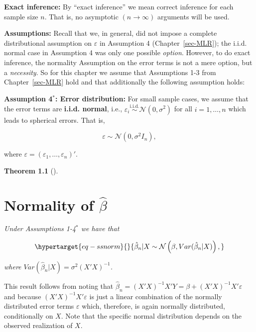 \documentclass[
  letterpaper,
  DIV=11,
  numbers=noendperiod]{scrreprt}
\theoremstyle{definition}
\theoremstyle{plain}
\newtheorem{theorem}{Theorem}[chapter]
\theoremstyle{plain}
\theoremstyle{remark}
\begin{document}
\textbf{Exact inference:} By ``exact inference'' we mean correct
inference for each sample size \(n\). That is, no asymptotic
\((n\to\infty)\) arguments will be used.

\textbf{Assumptions:} Recall that we, in general, did not impose a
complete distributional assumption on \(\varepsilon\) in Assumption 4
(Chapter~\ref{sec-MLR}); the i.i.d. normal case in Assumption 4 was only
one possible \emph{option}. However, to do exact inference, the
normality Assumption on the error terms is not a mere option, but a
\emph{necessity}. So for this chapter we assume that Assumptions 1-3
from Chapter~\ref{sec-MLR} hold and that additionally the following
assumption holds:

\textbf{Assumption 4\(^\boldsymbol{\ast}\): Error distribution:} For
small sample cases, we assume that the error terms are \textbf{i.i.d.
normal}, i.e.,
\(\varepsilon_i\overset{\operatorname{i.i.d.}}{\sim}\mathcal{N}(0,\sigma^2)\)
for all \(i=1,\dots,n\) which leads to spherical errors. That is,

\[
\varepsilon\sim\mathcal{N}\left(0,\sigma^2I_n\right),
\]

where \(\varepsilon=(\varepsilon_1,\dots,\varepsilon_n)'\).

\bigskip

\leavevmode{}%
\begin{theorem}[]\label{thm-normalbeta}


\hypertarget{normality-of-hatbeta}{%
\chapter{\texorpdfstring{Normality of
\(\hat\beta\)}{Normality of \textbackslash hat\textbackslash beta}}\label{normality-of-hatbeta}}

Under Assumptions 1-4\(^\ast\) we have that

\begin{equation}\protect\hypertarget{eq-ssnorm}{}{
\hat\beta_n|X \sim \mathcal{N}\left(\beta,Var(\hat\beta_n|X)\right),
}\label{eq-ssnorm}\end{equation}

where \(Var(\hat\beta_n|X)=\sigma^2(X'X)^{-1}\).

\end{theorem}

This result follows from noting that
\(\hat\beta_n=(X'X)^{-1}X'Y=\beta+(X'X)^{-1}X'\varepsilon\) and because
\((X'X)^{-1}X'\varepsilon\) is just a linear combination of the normally
distributed error terms \(\varepsilon\) which, therefore, is again
normally distributed, conditionally on \(X\). Note that the specific
normal distribution depends on the observed realization of \(X\).
\end{document}
